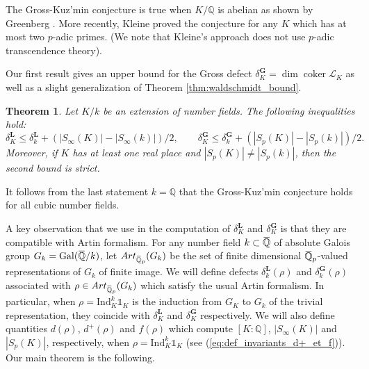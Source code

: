 \documentclass[12pt]{amsart}
\newcommand{\Q}{\mathbb{Q}}
\newcommand\bQ{\mathbb{Q}}
\newcommand\sL{\mathscr{L}}
\newcommand{\ob}[1]{\mkern 1.5mu\overline{\mkern-1.5mu#1\mkern-1.5mu}\mkern 1.5mu}
\newcommand{\Ind}{\mathrm{Ind}}
\newcommand{\Art}{\textrm{Art}}
\DeclareMathOperator{\Gal}{Gal}
\DeclareMathOperator{\coker}{coker}
\theoremstyle{defstyle}
\theoremstyle{thmstyle}
\newtheorem{THM}[subsection]{Theorem}
\begin{document}
	The Gross-Kuz’min conjecture is true when $K/\Q$ is abelian as shown by Greenberg \cite{greenberg1973}. More recently, Kleine \cite{kleine} proved the conjecture for any $K$ which has at most two $p$-adic primes. (We note that Kleine’s approach does not use $p$-adic transcendence theory). 
	
	
	Our first result gives an upper bound for the Gross defect $\delta^\textbf{G}_K=\dim \coker \sL_K$ as well as a slight generalization of Theorem \ref{thm:waldschmidt_bound}. 
	
	
	\begin{THM}\label{THM:generalization_Waldschmidt}
		Let $K/k$ be an extension of number fields. The following inequalities hold:
		\[\delta^\textbf{L}_K \leq \delta^\textbf{L}_k + \left(|S_\infty(K)|-|S_\infty(k)|\right)/2, \quad\quad
		\delta^\textbf{G}_K \leq \delta^\textbf{G}_k + \left(|S_p(K)|-|S_p(k)|\right)/2.\]
		Moreover, if $K$ has at least one real place and $|S_p(K)|\neq|S_p(k)|$, then the second bound is strict.
	\end{THM}
	It follows from the last statement $k=\bQ$ that the Gross-Kuz'min conjecture holds for all cubic number fields.
	
	A key observation that we use in the computation of $\delta^\textbf{L}_K$ and $\delta^\textbf{G}_K$ is that they are compatible with Artin formalism. For any number field $k\subset \ob{\Q}$ of absolute Galois group $G_k=\Gal(\ob{\Q}/k)$, let $\Art_{\ob{\Q}_p}(G_k)$ be the set of finite dimensional $\ob{\Q}_p$-valued representations of $G_k$ of finite image. We will define defects $\delta^\textbf{L}_k(\rho)$ and $\delta^\textbf{G}_k(\rho)$ associated with $\rho\in \Art_{\ob{\Q}_p}(G_k)$ which satisfy the usual Artin formalism. In particular, when $\rho=\Ind^k_K \mathds{1}_K$ is the induction from $G_K$ to $G_k$ of the trivial representation, they coincide with $\delta^\textbf{L}_K$ and $\delta^\textbf{G}_K$ respectively. We will also define quantities $d(\rho)$, $d^+(\rho)$ and $f(\rho)$ which compute $[K:\Q]$, $|S_\infty(K)|$ and $|S_p(K)|$, respectively, when $\rho=\Ind^k_K \mathds{1}_K$ (see (\ref{eq:def_invariants_d+_et_f})). Our main theorem is the following.
	
\end{document}
